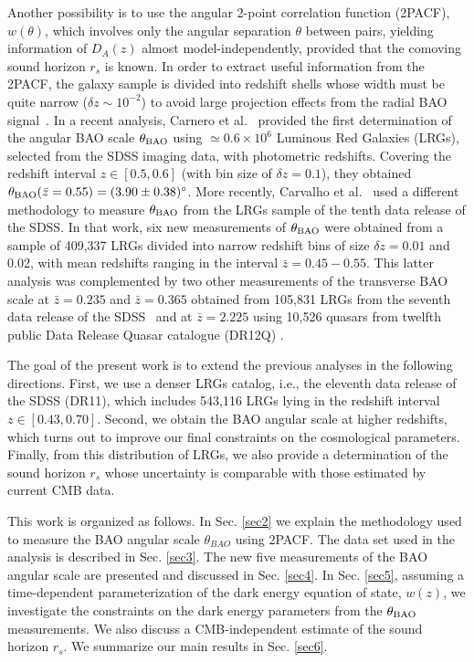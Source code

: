 \documentclass[a4paper,11pt]{article}
\begin{document}
Another possibility is to use the angular 2-point correlation function (2PACF), $w(\theta)$, which  involves only the angular separation $\theta$ between pairs, yielding information of $D_{A}(z)$ almost model-independently, provided that the comoving sound horizon $r_s$ is known.  In order to extract useful information from the 2PACF,  the galaxy sample is divided into redshift shells whose width must be quite narrow ($\delta z \sim 10^{-2}$) to avoid large projection effects from the radial BAO signal~\cite{Sanchez11,Carnero,Salazar16,Carvalho}. In a recent analysis, Carnero et al.~\cite{Carnero} provided the first determination of the angular BAO scale $\theta_{\rm{BAO}}$ using $\simeq 0.6 \times 10^6$ Luminous Red Galaxies (LRGs), selected from the SDSS imaging data, with photometric redshifts. Covering the redshift interval $z \in [0.5,0.6]$ (with bin size of $\delta z = 0.1$), they obtained $\theta_{\rm{BAO}} (\bar{z}=0.55) = (3.90 \pm 0.38)^{\circ}$. More recently, Carvalho et al.~\cite{Carvalho} used a different methodology to measure $\theta_{\rm{BAO}}$ from the LRGs sample of the tenth data release of the  SDSS. In that work, six new measurements of $\theta_{\rm{BAO}}$ were obtained from a sample of 409,337 LRGs divided into narrow redshift bins of size $\delta z = 0.01$ and 0.02, with mean redshifts ranging in the interval $\bar{z} = 0.45 - 0.55$. This latter analysis was complemented by two other measurements of the transverse BAO scale at $\bar{z} = 0.235$ and $\bar{z} = 0.365$ obtained from 105,831 LRGs from the seventh data release of the SDSS~\cite{Alcaniz} and at $\bar{z} = 2.225$ using 10,526 quasars from twelfth public Data Release Quasar catalogue (DR12Q) \cite{deCarvalho}.

The goal of the present work is to extend the previous analyses in the following directions. First, we use a denser LRGs catalog, i.e., the eleventh data release of the SDSS (DR11), which includes 543,116 LRGs lying in the redshift interval $z \in [0.43,0.70]$. Second, we obtain the BAO angular scale at higher redshifts, which turns out to improve our final constraints on the cosmological parameters. Finally, from this distribution of LRGs, we also provide a determination of the sound horizon $r_s$ whose uncertainty is comparable with those estimated by current CMB data.

This work is organized as follows. In Sec. \ref{sec2} we explain the methodology used to measure the BAO angular scale $\theta_{BAO}$ using 2PACF. The data set used in the analysis is described in Sec. \ref{sec3}.  The new five measurements of the BAO angular scale are presented and discussed in Sec. \ref{sec4}.  In Sec. \ref{sec5}, assuming a time-dependent parameterization of the dark energy equation of state, $w(z)$, we investigate the constraints on the dark energy  parameters from the $\theta_{\rm{BAO}}$ measurements. We also discuss a CMB-independent estimate of the sound horizon $r_s$. We summarize our main results in Sec. \ref{sec6}.
\end{document}
